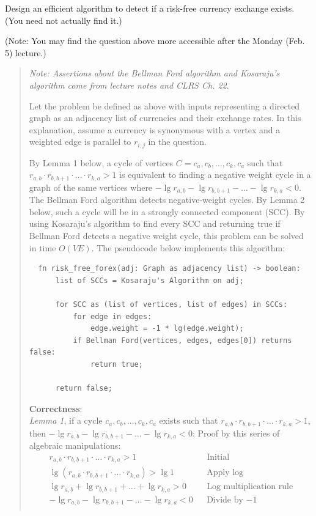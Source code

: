 \documentclass[11pt]{article}
\begin{document}
\begin{enumerate}
Design an efficient algorithm to detect if a risk-free currency exchange
exists.  (You need not actually find it.)

(Note: You may find the question above more accessible after the Monday (Feb. 5) lecture.)

\begin{quote}
  \color{purple}
  \textit{Note: Assertions about the Bellman Ford algorithm and Kosaraju's algorithm come from lecture notes and CLRS Ch. 22}.

  \medskip
  Let the problem be defined as above with inputs representing a directed graph as an adjacency list of currencies and their exchange rates. In this explanation, assume a currency is synonymous with a vertex and a weighted edge is parallel to $r_{i,j}$ in the question.

  \medskip
  By Lemma 1 below, a cycle of vertices $C = c_a, c_b, \dots, c_k, c_a$ such that $r_{a, b} \cdot r_{b, b + 1} \cdot \dots \cdot r_{k, a} > 1$ is equivalent to finding a negative weight cycle in a graph of the same vertices where $-\lg r_{a, b} - \lg r_{b, b + 1} - \dots - \lg r_{k, a} < 0$. The Bellman Ford algorithm detects negative-weight cycles. By Lemma 2 below, such a cycle will be in a strongly connected component (SCC). By using Kosaraju's algorithm to find every SCC and returning true if Bellman Ford detects a negative weight cycle, this problem can be solved in time $O(VE)$. The pseudocode below implements this algorithm:

  \begin{verbatim}
  fn risk_free_forex(adj: Graph as adjacency list) -> boolean:
      list of SCCs = Kosaraju's Algorithm on adj;

      for SCC as (list of vertices, list of edges) in SCCs:
          for edge in edges:
              edge.weight = -1 * lg(edge.weight);
          if Bellman Ford(vertices, edges, edges[0]) returns false: 
              return true;

      return false; 
  \end{verbatim}

\medskip 
\textbf{Correctness}:\\ 
\textit{Lemma 1}, if a cycle $c_a, c_b, \dots, c_k, c_a$ exists such that $r_{a, b} \cdot r_{b, b + 1} \cdot \dots \cdot r_{k, a} > 1$, then $-\lg r_{a, b} - \lg r_{b, b + 1} - \dots - \lg r_{k, a} < 0$: Proof by this series of algebraic manipulations: 
\begin{align*}
    && r_{a, b} \cdot r_{b, b + 1} \cdot \dots \cdot r_{k, a} > 1 && \text{Initial} && \\
    && \lg (r_{a, b} \cdot r_{b, b + 1} \cdot \dots \cdot r_{k, a}) > \lg 1 && \text{Apply log} && \\
    && \lg r_{a, b} + \lg r_{b, b + 1} + \dots + \lg r_{k, a} > 0 && \text{Log multiplication rule} && \\
    && -\lg r_{a, b} - \lg r_{b, b + 1} - \dots - \lg r_{k, a} < 0 && \text{Divide by $-1$} && \\
\end{align*} 


\end{quote}
\end{enumerate}
\end{document}
